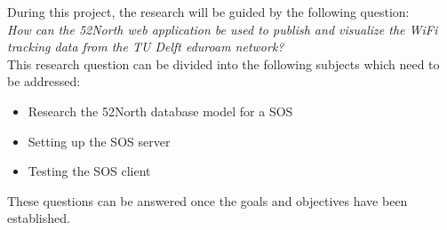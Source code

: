 During this project, the research will be guided by the following question:\\
\textit{How can the 52North web application be used to publish and visualize the WiFi tracking data from the TU Delft eduroam network?}\\

This research question can be divided into the following subjects which need to be addressed:
\begin{itemize}
\item Research the 52North database model for a SOS
\item Setting up the SOS server
\item Testing the SOS client
\end{itemize}

These questions can be answered once the goals and objectives have been established.

